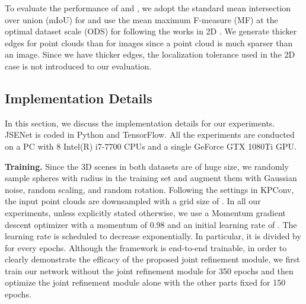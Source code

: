 \documentclass[runningheads]{llncs}
\begin{document}
To evaluate the performance of {{\SemSeg} and {\SemEdgeD}}, 
we {adopt} 
the standard mean intersection over union (mIoU) for {\SemSeg} and use the mean maximum F-measure (MF) at the optimal dataset scale (ODS) for {\SemEdgeD} following the works in 2D \cite{yu2017casenet,liu2018semantic,yu2018simultaneous,acuna2019devil}. 
We generate thicker edges for point clouds than for images since a point cloud is much sparser than an image. {Since we have thicker edges, the localization tolerance used in the 2D case
is not introduced to our evaluation.}


\subsection{Implementation Details} \label{Implementation}
In this section, we discuss the implementation details for our experiments. JSENet is
coded in Python and TensorFlow. All the experiments are conducted on {a PC with 8 Intel(R) i7-7700 CPUs and} a single GeForce GTX 1080Ti GPU. 


\smallskip \noindent \textbf{Training.}
Since the 3D scenes in {both}
datasets are {of huge size}, we randomly sample spheres with  radius in the training set and augment them with Gaussian noise, random scaling, and random rotation. Following the settings in KPConv, the input point clouds are downsampled with a grid size of .
In all our experiments, unless explicitly stated otherwise, we use a Momentum gradient descent optimizer with a momentum of 0.98 and an initial learning rate of . The learning rate is scheduled to decrease exponentially. In particular, it {is} divided by  {for} every  epochs.
Although the framework is end-to-end trainable, in order to clearly demonstrate the efficacy of the proposed joint refinement module, we first train our network without the joint refinement module for 350 epochs and then optimize the joint refinement module alone with {the} other parts fixed for 150 epochs.
\end{document}
